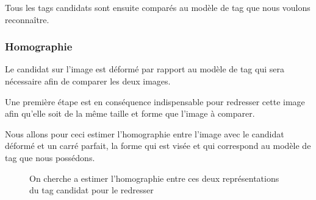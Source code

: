         Tous les tags candidats sont ensuite comparés au modèle de tag que nous voulons reconnaître.

        \subsubsection{Homographie}
        \label{subsubsec:homographie}

        Le candidat sur l'image est déformé par rapport au modèle de tag qui sera nécessaire afin de comparer les deux images.

        Une première étape est en conséquence indispensable pour redresser cette image afin qu'elle soit de la même taille et forme que l'image à comparer.

        Nous allons pour ceci estimer l'homographie entre l'image avec le candidat déformé et un carré parfait, la forme qui est visée et qui correspond au modèle de tag que nous possédons.

        \begin{figure}[h]
            \centering
            \hspace{.02\textwidth}
            \caption{On cherche a estimer l'homographie entre ces deux représentations du tag candidat pour le redresser}
        \end{figure}

